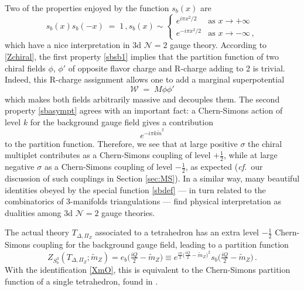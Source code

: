 \documentclass[hyper,letterpaper]{JHEP3}
\numberwithin{equation}{section}
\newcommand{\be}{\begin{equation}}
\newcommand{\ee}{\end{equation}}
\newcommand{\cf}{\emph{cf.}}
\newcommand{\CN}{\mathcal{N}}
\newcommand{\CW}{\mathcal{W}}
\begin{document}
Two of the properties enjoyed by the function $s_b(x)$ are
%
\begin{subequations}
\be
s_b(x) s_b(-x) \; = \; 1\,,
\label{sbsb1}
\ee
\be
s_b(x) \sim
\begin{cases}
e^{i \pi x^2/2} & \mbox{as } x \to + \infty \\
e^{-i \pi x^2/2} & \mbox{as } x \to - \infty\,,
\end{cases}
\label{sbasympt}
\ee
\end{subequations}
%
which have a nice interpretation in 3d $\CN=2$ gauge theory.
According to \eqref{Zchiral}, the first property \eqref{sbsb1}
implies that the partition function of two chiral fields $\phi$, $\phi'$ of opposite flavor charge and R-charge adding to 2 is trivial.
Indeed, this R-charge assignment allows one to add a marginal superpotential
%
\begin{equation}
\CW \; = \; M \phi \phi'
\end{equation}
%
which makes both fields arbitrarily massive and decouples them.
The second property \eqref{sbasympt} agrees with an important fact:
a Chern-Simons action of level $k$ for the background gauge field gives a contribution
%
\begin{equation}
e^{- i \pi k \tilde m^2}
\label{z3dCSk}
\end{equation}
%
to the partition function. Therefore, we see that at large positive $\sigma$ the chiral multiplet
contributes as a Chern-Simons coupling of level $+\tfrac{1}{2}$, while at large negative $\sigma$
as a Chern-Simons coupling of level $-\tfrac{1}{2}$, as expected \cite{AHISS} (\cf\ our discussion of such couplings in Section \ref{sec:MS}).
In a similar way, many beautiful identities obeyed by the special function \eqref{sbdef} --- in turn related to the combinatorics of 3-manifolds triangulations ---
find physical interpretation as dualities among 3d $\CN=2$ gauge theories.

The actual theory $T_{\Delta,\Pi_Z}$ associated to a tetrahedron has an extra level $-\tfrac12$ Chern-Simons coupling for the background gauge field, leading to a partition function
%
\be \boxed{ Z_{S^3_b}(T_{\Delta,\Pi_Z};\tilde m_Z) = e_b\big(\tfrac{iQ}{2}-\tilde m_Z\big) \equiv e^{\frac{i\pi}{2}\big(\frac{iQ}2-\tilde m_Z\big)^2}s_b\big(\tfrac{iQ}{2}-\tilde m_Z\big) \,.}
\label{ZDelta}\ee
%
With the identification \eqref{XmO}, this is equivalent to the Chern-Simons partition function of a single tetrahedron, found in \cite{Dimofte-QRS}.
\end{document}
